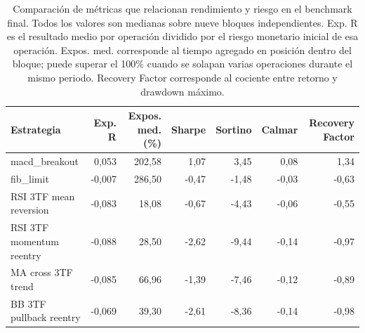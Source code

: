 \begin{table}[H]
\centering
\scriptsize
\setlength{\tabcolsep}{3pt}
\begin{tabular}{lrrrrrr}
\hline
Estrategia & Exp. R & Expos. med. (\%) & Sharpe & Sortino & Calmar & Recovery Factor \\
\hline
macd\_breakout & 0,053 & 202,58 & 1,07 & 3,45 & 0,08 & 1,34 \\
fib\_limit & -0,007 & 286,50 & -0,47 & -1,48 & -0,03 & -0,63 \\
RSI 3TF mean reversion & -0,083 & 18,08 & -0,67 & -4,43 & -0,06 & -0,55 \\
RSI 3TF momentum reentry & -0,088 & 28,50 & -2,62 & -9,44 & -0,14 & -0,97 \\
MA cross 3TF trend & -0,085 & 66,96 & -1,39 & -7,46 & -0,12 & -0,89 \\
BB 3TF pullback reentry & -0,069 & 39,30 & -2,61 & -8,36 & -0,14 & -0,98 \\
\hline
\end{tabular}
\caption[Comparaci\'on de m\'etricas de riesgo en el benchmark final]{Comparaci\'on de m\'etricas que relacionan rendimiento y riesgo en el benchmark final.
Todos los valores son medianas sobre nueve bloques independientes. Exp. R es
el resultado medio por operaci\'on dividido por el riesgo monetario inicial de
esa operaci\'on. Expos. med. corresponde al tiempo agregado en posici\'on dentro
del bloque; puede superar el 100\% cuando se solapan varias operaciones durante
el mismo periodo. Recovery Factor corresponde al cociente entre retorno y
drawdown m\'aximo.}
\label{tab:benchmarks-w2-metricas-riesgo}
\end{table}
